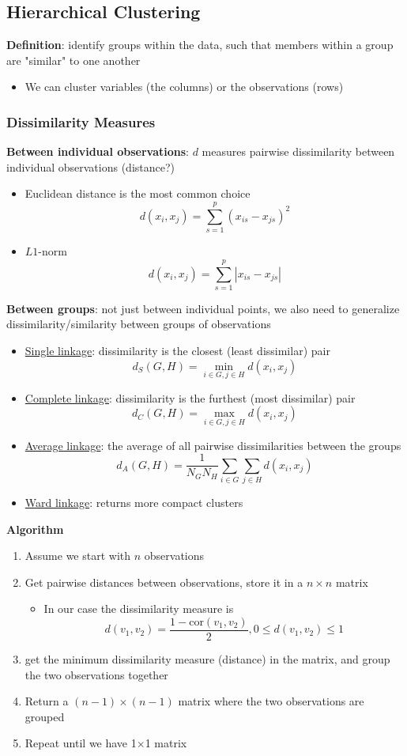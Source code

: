 \documentclass{article}
\begin{document}
\begin{multicols}{2}
\subsection{Hierarchical Clustering}
\textbf{Definition}: identify groups within the data, such that members within a group are "similar" to one another
\begin{itemize}
	\item We can cluster variables (the columns) or the observations (rows)
\end{itemize}
\subsubsection{Dissimilarity Measures}
\textbf{Between individual observations}: $d$ measures pairwise dissimilarity between individual observations (distance?)
\begin{itemize}
	\item Euclidean distance is the most common choice
	$$d(x_i,x_j) = \sum_{s=1}^p(x_{is}-x_{js})^2$$
	\item $L1$-norm
	$$d(x_i,x_j) = \sum_{s=1}^p|x_{is}-x_{js}|$$
\end{itemize}
\textbf{Between groups}: not just between individual points, we also need to generalize dissimilarity/similarity between groups of observations
\begin{itemize}
	\item \underline{Single linkage}: dissimilarity is the closest (least dissimilar) pair
	$$d_S(G,H) = \min_{i\in G,j\in H}d(x_i,x_j)$$
	\item \underline{Complete linkage}: dissimilarity is the furthest (most dissimilar) pair
	$$d_C(G,H) = \max_{i\in G,j\in H}d(x_i,x_j)$$
	\item \underline{Average linkage}: the average of all pairwise dissimilarities between the groups
	$$d_A(G,H) = \frac{1}{N_GN_H}\sum_{i\in G}\sum_{j\in H}d(x_i,x_j)$$
	\item \underline{Ward linkage}: returns more compact clusters
\end{itemize}
\textbf{Algorithm}
\begin{enumerate}
	\item Assume we start with $n$ observations
	\item Get pairwise distances between observations, store it in a $n\times n$ matrix
	\begin{itemize}
		\item In our case the dissimilarity measure is
		$$d(v_1,v_2)=\frac{1-\text{cor}(v_1,v_2)}{2}, 0\leq d(v_1,v_2)\leq1$$
	\end{itemize}
	\item get the minimum dissimilarity measure (distance) in the matrix, and group the two observations together
	\item Return a $(n-1)\times (n-1)$ matrix where the two observations are grouped
	\item Repeat until we have 1$\times$1 matrix


\end{enumerate}
\end{multicols}
\end{document}
